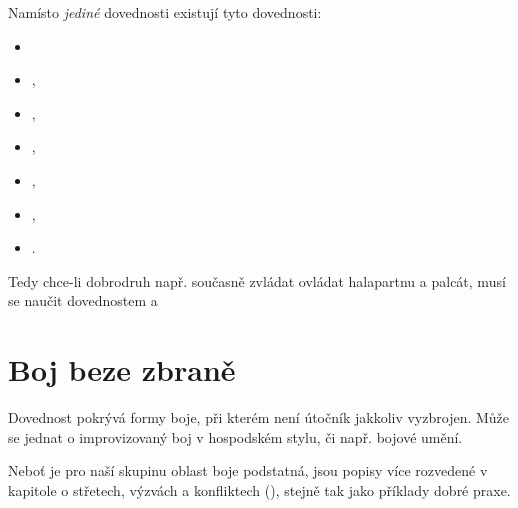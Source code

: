 \documentclass[../main.tex]{subfiles}
\begin{document}
\begin{Real}

  Namísto \emph{jediné} dovednosti  existují tyto dovednosti:
  \begin{itemize}
    \item {}
    \item {},
    \item {},
    \item {},
    \item {},
    \item {},
    \item {}.
  \end{itemize}
  Tedy chce-li dobrodruh např. současně zvládat ovládat halapartnu a palcát, musí se
  naučit dovednostem  a 
\end{Real}

\section{Boj beze zbraně}
\label{sec:bojbezezbrane}

Dovednost  pokrývá formy boje, při kterém není útočník jakkoliv
vyzbrojen. Může se jednat o improvizovaný boj v hospodském stylu, či např. bojové umění.

Neboť je pro naší skupinu oblast boje podstatná, jsou popisy více rozvedené v kapitole o
střetech, výzvách a konfliktech (), stejně tak jako příklady dobré praxe.
\end{document}
